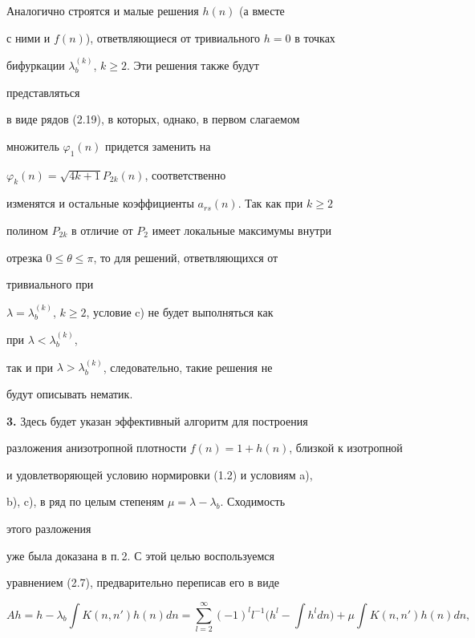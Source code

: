  


\begin{note} Аналогично строятся и малые решения $h(n)$ (а вместе 


с ними и $f(n)$), ответвляющиеся от тривиального $h=0$ в точках  


бифуркации $\lambda^{(k)}_b$, $k\ge 2$. Эти решения также будут 


представляться 


в виде рядов (2.19), в которых, однако, в первом слагаемом 


множитель $\varphi_1(n)$ придется заменить на 


$\varphi_k(n)=\sqrt{4k+1}P_{2k}(n)$, соответственно 


изменятся и остальные коэффициенты $a_{rs}(n)$. Так как при $k\ge 2$ 


полином $P_{2k}$ в отличие от $P_2$ имеет локальные максимумы внутри 


отрезка $0\le\theta\le\pi$, то для решений, ответвляющихся от 


тривиального при 


$\lambda=\lambda^{(k)}_b$, $k\ge 2$, условие c) не будет выполняться как 


при $\lambda<\lambda^{(k)}_b$, 


так и при $\lambda>\lambda^{(k)}_b$, следовательно, такие решения не 


будут описывать нематик. 


\end{note}


 


{\bf 3.} Здесь будет указан эффективный алгоритм для построения  


разложения анизотропной плотности $f(n)=1+h(n)$, близкой к изотропной 


и удовлетворяющей условию нормировки (1.2) и условиям a), 


b), c), в ряд по целым степеням $\mu=\lambda-\lambda_b$. Сходимость 


этого разложения 


уже была доказана в п.\,2. С этой целью воспользуемся 


уравнением (2.7), предварительно переписав его в виде 


\begin{equation} 


A h=h-\lambda_b\int K(n,n')h(n)dn= 


\sum^\infty_{l=2}(-1)^l l^{-1}\Big(h^l-\int h^l dn\Big) 


+\mu\int K(n,n')h(n)dn,\tag{3.1} 


\end{equation} 


